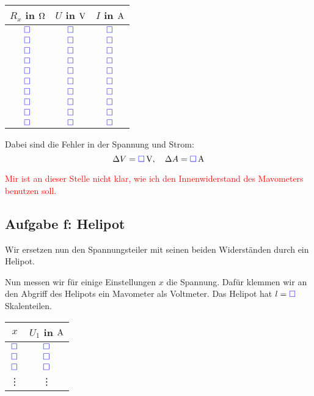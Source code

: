 \documentclass[11pt,german]{article}
\newcommand{\messwert}{\textcolor{blue}{\square}}
\begin{document}
\begin{center}
	\begin{tabular}{ccc}
		$R_x$ in $\unit \Omega$ & $U$ in $\unit V$ & $I$ in $\unit A$ \\
		\hline
		$\messwert$ & $\messwert$ & $\messwert$ \\
		$\messwert$ & $\messwert$ & $\messwert$ \\
		$\messwert$ & $\messwert$ & $\messwert$ \\
		$\messwert$ & $\messwert$ & $\messwert$ \\
		$\messwert$ & $\messwert$ & $\messwert$ \\
		$\messwert$ & $\messwert$ & $\messwert$ \\
		$\messwert$ & $\messwert$ & $\messwert$ \\
		$\messwert$ & $\messwert$ & $\messwert$ \\
		$\messwert$ & $\messwert$ & $\messwert$ \\
		$\messwert$ & $\messwert$ & $\messwert$
	\end{tabular}
\end{center}

Dabei sind die Fehler in der Spannung und Strom:
\[ \Delta V = \unit[\messwert]V, \quad \Delta A = \unit[\messwert] A \]

\textcolor{red}{Mir ist an dieser Stelle nicht klar, wie ich den
Innenwiderstand des Mavometers benutzen soll.}

\subsection{Aufgabe f: Helipot}

\label{durchführung-f}

Wir ersetzen nun den Spannungsteiler mit seinen beiden Widerständen durch ein Helipot.

Nun messen wir für einige Einstellungen $x$ die Spannung. Dafür klemmen wir an den Abgriff des Helipots ein Mavometer als Voltmeter. Das Helipot hat $l = \messwert$ Skalenteilen.

\begin{center}
	\begin{tabular}{cc}
		$x$ & $U_1$ in $\unit A$ \\
		\hline
		$\messwert$ & $\messwert$ \\
		$\messwert$ & $\messwert$ \\
		$\messwert$ & $\messwert$ \\
			 \vdots & \vdots
	\end{tabular}
\end{center}
\end{document}

